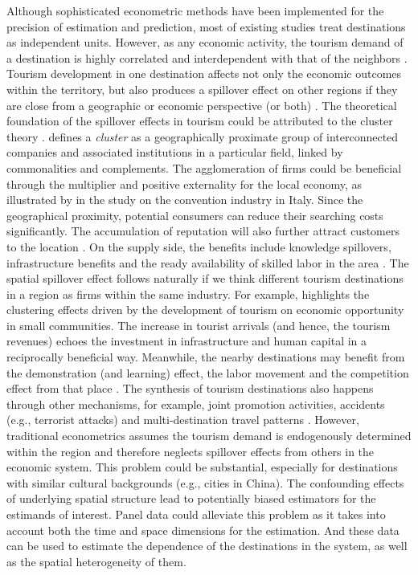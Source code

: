 \documentclass[11pt,a4paper]{amsart}
\theoremstyle{plain}
\theoremstyle{definition}
\begin{document}
\noindent Although sophisticated econometric methods have been implemented for the precision of estimation and prediction, most of existing studies treat destinations as independent units. However, as any economic activity, the tourism demand of a destination is highly correlated and interdependent with that of the neighbors \parencite{longPoolingTourismDemand2019}. Tourism development in one destination affects not only the economic outcomes within the territory, but also produces a spillover effect on other regions if they are close from a geographic or economic perspective (or both) \parencite{liTourismRegionalIncome2016}. The theoretical foundation of the spillover effects in tourism could be attributed to the cluster theory \parencite{kimVisitorFlowSpillover2022}. \textcite{porterCompetition2008} defines a \textit{cluster} as a geographically proximate group of interconnected companies and associated institutions in a particular field, linked by commonalities and complements. The agglomeration of firms could be beneficial through the multiplier and positive externality for the local economy, as illustrated by \textcite{berniniConventionIndustryDestination2009} in the study on the convention industry in Italy. Since the geographical proximity, potential consumers can reduce their searching costs significantly. The accumulation of reputation will also further attract customers to the location \parencite{kuahClusterTheoryPractice2002}. On the supply side, the benefits include knowledge spillovers, infrastructure benefits and the ready availability of skilled labor in the area \parencite{kuahClusterTheoryPractice2002}. The spatial spillover effect follows naturally if we think different tourism destinations in a region as firms within the same industry. For example, \textcite{michaelTourismMicroClusters2003} highlights the clustering effects driven by the development of tourism  on economic opportunity in small communities. The increase in tourist arrivals (and hence, the tourism revenues) echoes the investment in infrastructure and human capital in a reciprocally beneficial way. Meanwhile, the nearby destinations may benefit from the demonstration (and learning) effect, the labor movement and the competition effect from that place \parencite{longPoolingTourismDemand2019}. The synthesis of tourism destinations also happens through other mechanisms, for example, joint promotion activities, accidents (e.g., terrorist attacks) and multi-destination travel patterns \parencite{yangSpatialEconometricApproach2012}. However, traditional econometrics assumes the tourism demand is endogenously determined within the region and therefore neglects spillover effects from others in the economic system. This problem could be substantial, especially for destinations with similar cultural backgrounds (e.g., cities in China). The confounding effects of underlying spatial structure lead to potentially biased estimators for the estimands of interest. Panel data could alleviate this problem as it takes into account both the time and space dimensions for the estimation. And these data can be used to estimate the dependence of the destinations in the system, as well as the spatial heterogeneity of them. 
\end{document}
